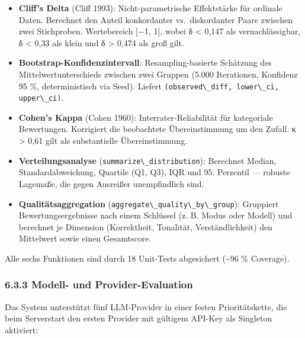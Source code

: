 \begin{itemize}
\tightlist
\item
  \textbf{Cliff's Delta} (Cliff 1993): Nicht-parametrische Effektstärke
  für ordinale Daten. Berechnet den Anteil konkordanter vs.~diskordanter
  Paare zwischen zwei Stichproben. Wertebereich {[}−1, 1{]}, wobei
  \textbar δ\textbar{} \textless{} 0,147 als vernachlässigbar,
  \textbar δ\textbar{} \textless{} 0,33 als klein und
  \textbar δ\textbar{} \textgreater{} 0,474 als groß gilt.
\item
  \textbf{Bootstrap-Konfidenzintervall}: Resampling-basierte Schätzung
  des Mittelwertunterschieds zwischen zwei Gruppen (5.000 Iterationen,
  Konfidenz 95 \%, deterministisch via Seed). Liefert
  \passthrough{\lstinline!(observed\_diff, lower\_ci, upper\_ci)!}.
\item
  \textbf{Cohen's Kappa} (Cohen 1960): Interrater-Reliabilität für
  kategoriale Bewertungen. Korrigiert die beobachtete Übereinstimmung um
  den Zufall. κ \textgreater{} 0,61 gilt als substantielle
  Übereinstimmung.
\item
  \textbf{Verteilungsanalyse}
  (\passthrough{\lstinline!summarize\_distribution!}): Berechnet Median,
  Standardabweichung, Quartile (Q1, Q3), IQR und 95. Perzentil ---
  robuste Lagemaße, die gegen Ausreißer unempfindlich sind.
\item
  \textbf{Qualitätsaggregation}
  (\passthrough{\lstinline!aggregate\_quality\_by\_group!}): Gruppiert
  Bewertungsergebnisse nach einem Schlüssel (z. B. Modus oder Modell)
  und berechnet je Dimension (Korrektheit, Tonalität, Verständlichkeit)
  den Mittelwert sowie einen Gesamtscore.
\end{itemize}

Alle sechs Funktionen sind durch 18 Unit-Tests abgesichert
(\textasciitilde96 \% Coverage).

\subsubsection{6.3.3 Modell- und
Provider-Evaluation}\label{modell--und-provider-evaluation}

Das System unterstützt fünf LLM-Provider in einer festen
Prioritätskette, die beim Serverstart den ersten Provider mit gültigem
API-Key als Singleton aktiviert:

